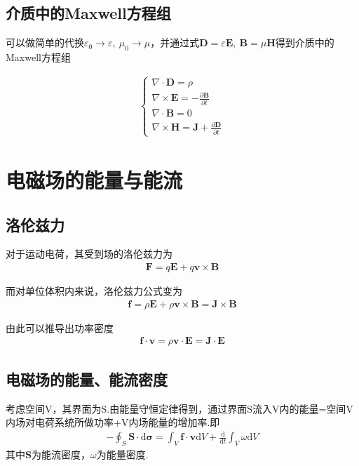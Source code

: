 \documentclass[main.tex]{subfiles}
\begin{document}
\subsection{介质中的Maxwell方程组}
可以做简单的代换$\varepsilon _0 \to \varepsilon ,\ \mu _0 \to \mu$，并通过式$\boldsymbol{D} = \varepsilon \boldsymbol{E},\ \boldsymbol{B} = \mu \boldsymbol{H}$得到介质中的Maxwell方程组

\begin{align}
\label{Maxwell3}\left\{\begin{array}{l}
 \nabla \cdot \boldsymbol{D} = \rho\\
 \nabla \times \boldsymbol{E} = -\frac{\partial \boldsymbol{B}}{\partial t}\\
\nabla \cdot  \boldsymbol{B} = 0\\
\nabla \times \boldsymbol{H} =\boldsymbol{J}+\frac{\partial \boldsymbol{D}}{\partial t}
\end{array}\right.
\end{align}

\section{电磁场的能量与能流}
\subsection{洛伦兹力}
对于运动电荷，其受到场的洛伦兹力为
\begin{align}
    \boldsymbol{F} = q\boldsymbol{E} +q\boldsymbol{v} \times \boldsymbol{B} 
\end{align}

而对单位体积内来说，洛伦兹力公式变为
\begin{align}
    \boldsymbol{f} = \rho \boldsymbol{E} +\rho \boldsymbol{v} \times \boldsymbol{B} = \boldsymbol{J} \times \boldsymbol{B}
\end{align}

由此可以推导出功率密度
\begin{align}
    \label{guanxi3}\boldsymbol{f} \cdot \boldsymbol{v}= \rho \boldsymbol{v}\cdot \boldsymbol{E} = \boldsymbol{J}\cdot \boldsymbol{E}
\end{align}

\subsection{电磁场的能量、能流密度}
考虑空间V，其界面为S.由能量守恒定律得到，通过界面S流入V内的能量=空间V内场对电荷系统所做功率+V内场能量的增加率.即
\begin{align}
    \label{nengliumidu}-\oint_{S}^{} \boldsymbol{S} \cdot \mathrm{d} \boldsymbol{\sigma } = \int_{V}^{} \boldsymbol{f} \cdot \boldsymbol{v}\mathrm{d}V+\frac{\mathrm{d} }{\mathrm{d} t} \int_{V}^{}\omega \mathrm{d}V 
\end{align}
其中$\boldsymbol{S}$为能流密度，$\omega$为能量密度.
\end{document}
